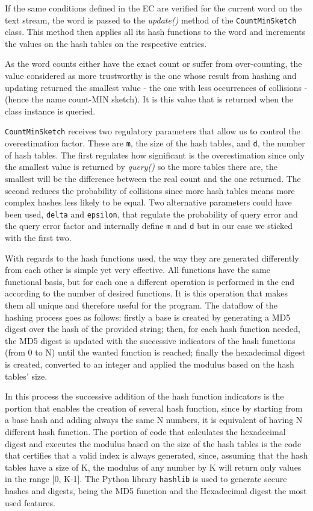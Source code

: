 \documentclass[shortpaper]{revdetua}
\begin{document}
If the same conditions defined in the EC are verified for the current word on the text stream, the word is passed to the \textit{update()} method of 
the \texttt{CountMinSketch} class.
This method then applies all its hash functions to the word and increments the values on the hash tables on the respective entries.

As the word counts either have the exact count or suffer from over-counting, the value considered as more trustworthy is the one whose result from hashing and 
updating returned the smallest value - the one with less occurrences of collisions - (hence the name count-MIN sketch).
It is this value that is returned when the class instance is queried.

\texttt{CountMinSketch} receives two regulatory parameters that allow us to control the overestimation factor.
These are \texttt{m}, the size of the hash tables, and \texttt{d}, the number of hash tables.
The first regulates how significant is the overestimation since only the smallest value is returned by \textit{query()} so the more tables there are, the 
smallest will be the difference between the real count and the one returned.
The second reduces the probability of collisions since more hash tables means more complex hashes less likely to be equal.
Two alternative parameters could have been used, \texttt{delta} and \texttt{epsilon}, that regulate the probability of query error and the query error factor 
and internally define \texttt{m} and \texttt{d} but in our case we sticked with the first two. 

With regards to the hash functions used, the way they are generated differently from each other is simple yet very effective.
All functions have the same functional basis, but for each one a different operation is performed in the end according to the number of desired functions.
It is this operation that makes them all unique and therefore useful for the program.
The dataflow of the hashing process goes as follows: 
firstly a base is created by generating a MD5 digest over the hash of the provided string; 
then, for each hash function needed, the MD5 digest is updated with the successive indicators of the hash functions (from 0 to N) until the wanted function is reached;
finally the hexadecimal digest is created, converted to an integer and applied the modulus based on the hash tables' size.

In this process the successive addition of the hash function indicators is the portion that enables the creation of several hash function, since by starting 
from a base hash and adding always the same N numbers, it is equivalent of having N different hash function. 
The portion of code that calculates the hexadecimal digest and executes the modulus based on the size of the hash tables is the code that certifies that a 
valid index is always generated, since, assuming that the hash tables have a size of K, the modulus of any number by K will return only values in the range [0, K-1]. 
The Python library \texttt{hashlib} \cite{hashlib} is used to generate secure hashes and digests, being the MD5 function and the Hexadecimal digest the most used features.
\end{document}
